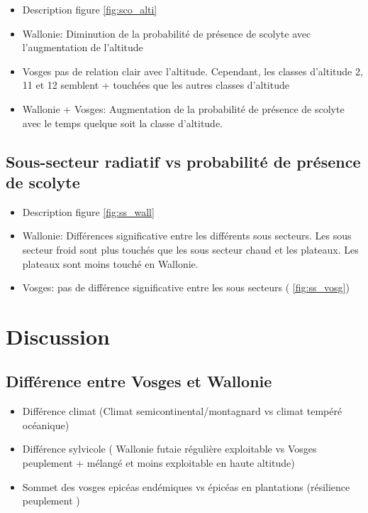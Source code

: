 \documentclass[3p,times]{elsarticle}
\begin{document}
\begin{itemize}
	\item Description figure \ref{fig:sco_alti}
	\item Wallonie: Diminution de la probabilité de présence de scolyte avec l'augmentation de l'altitude 
	\item Vosges pas de relation clair avec l'altitude. Cependant, les classes d'altitude 2, 11 et 12 semblent + touchées que les autres classes d'altitude
	
	\item Wallonie + Vosges: Augmentation de la probabilité de présence de scolyte avec le temps quelque soit la classe d'altitude.
\end{itemize}



\subsection{Sous-secteur radiatif vs probabilité de présence de scolyte}


\begin{itemize}
	\item Description figure \ref{fig:ss_wall} 
	\item Wallonie: Différences significative entre les différents sous secteurs. Les sous secteur froid sont  plus touchés que les sous secteur chaud et les plateaux. Les plateaux sont moins touché en Wallonie.
	\item Vosges: pas de différence significative entre les sous secteurs ( \ref{fig:ss_vosg})
	
\end{itemize}



\section{Discussion}

\subsection{Différence entre Vosges et Wallonie}
\begin{itemize}
	\item Différence climat (Climat semicontinental/montagnard vs climat tempéré océanique)
	\item Différence sylvicole ( Wallonie futaie régulière exploitable vs Vosges peuplement + mélangé et moins exploitable en haute altitude)
	\item Sommet des vosges epicéas endémiques vs épicéas en plantations (résilience peuplement )
	
\end{itemize}
\end{document}
